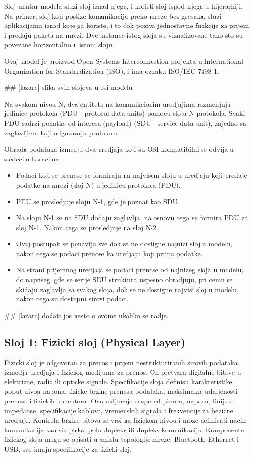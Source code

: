 \documentclass[a4paper,12pt, master]{etf}
\begin{document}
	Sloj unutar modela sluzi sloj iznad njega, i koristi sloj ispod njega u hijerarhiji. Na 
	primer, sloj koji postize komunikaciju preko mreze bez gresaka, sluzi aplikacijama iznad 
	koje ga koriste, i to dok poziva jednostavne funkcije za prijem i predaju paketa na mrezi. 
	Dve instance istog sloja su vizualizovane tako sto su povezane horizontalno u istom sloju.

	Ovaj model je proizvod Open Systems Interconnection projekta u International Organization 
	for Standardization (ISO), i ima oznaku ISO/IEC 7498-1.

	\#\# [lazarc] slika svih slojeva u osi modelu

	Na svakom nivou N, dva entiteta na komunikcionim uredjajima razmenjuju jedinice protokola 
	(PDU - protocol data units) pomocu sloja N protokola. Svaki PDU sadrzi podatke od interesa 
	(payload) (SDU - service data unit), zajedno sa zaglavljima koji odgovaraju protokolu.

	Obrada podataka izmedju dva uredjaja koji su OSI-kompatibilni se odvija u sledecim 
	koracima:
	\begin{itemize}
		\item Podaci koji se prenose se formiraju na najvisem sloju u uredjaju koji predaje 
		podatke na mrezi (sloj N) u jedinicu protokola (PDU).
		\item PDU se prosledjuje sloju N-1, gde je poznat kao SDU.
		\item Na sloju N-1 se na SDU dodaju zaglavlja, na osnovu cega se formira PDU za sloj 
		N-1. Nakon cega se prosledjuje na sloj N-2.
		\item Ovaj postupak se ponavlja sve dok se ne dostigne najnizi sloj u modelu, nakon 
		cega se podaci prenose ka uredjaju koji prima podatke.
		\item Na strani prijemnog uredjaja se podaci prenose od najnizeg sloja u modelu, do
		najviseg, gde se serije SDU struktura uspesno obradjuju, pri cemu se skidaju zaglavlja 
		sa svakog sloja, dok se ne dostigne najvisi sloj u modelu, nakon cega su dostupni 
		sirovi podaci.
	\end{itemize}

	\#\# [lazarc] dodati jos nesto o ovome ukoliko se nadje.

	\subsection{Sloj 1: Fizicki sloj (Physical Layer)}

	Fizicki sloj je odgovoran za prenos i prijem nestrukturiranih sirovih podataka izmedju 
	uredjaja i fizickog medijuma za prenos. On pretvara digitalne bitove u elektricne, radio 
	ili opticke signale. Specifikacije sloja definisu karakteristike poput nivoa napona, 
	fizicke brzine prenosa podataka, maksimalne udaljenosti prenosa i fizickih konektora. Ovo 
	ukljucuje raspored pinova, napona, linijske impedanse, specifikacije kablova, vremenskih 
	signala i frekvencije za bezicne uredjaje. Kontrola brzine bitova se vrsi na fizickom 
	nivou i moze definisati nacin komunikacije kao simpleks, polu dupleks ili dupleks 
	komunikaciju. Komponente fizickog sloja mogu se opisati u smislu topologije mreze. 
	Bluetooth, Ethernet i USB, sve imaju specifikacije za fizicki sloj.
\end{document}
